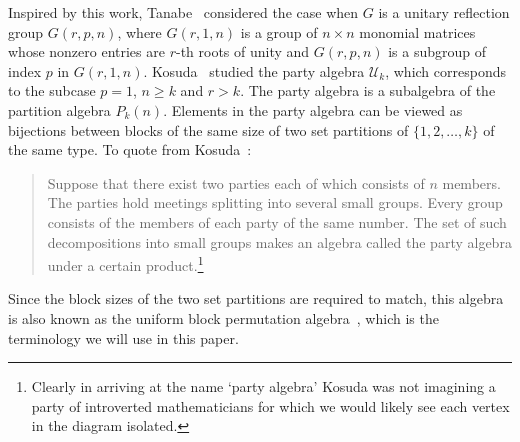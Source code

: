 \documentclass[10pt]{amsart}
\theoremstyle{definition}
\theoremstyle{remark}
\begin{document}
Inspired by this work, Tanabe~\cite{Tanabe.1997} considered the case when $G$ is a unitary reflection group $G(r,p,n)$, where $G(r,1,n)$ is a group
of $n \times n$ monomial matrices whose nonzero entries are $r$-th roots of unity and $G(r,p,n)$ is a subgroup of index $p$ in $G(r,1,n)$.
Kosuda~\cite{Kosuda.2000, Kosuda.2006} studied the party algebra $\mathcal{U}_k$, which corresponds to the subcase $p=1$, $n \geqslant k$
and $r>k$. The party algebra is a subalgebra of the partition algebra $P_k(n)$. Elements in the party algebra can be viewed as bijections between blocks
of the same size of two set partitions of $\{1,2,\ldots,k\}$ of the same type. To quote from Kosuda~\cite{Kosuda.2000}:
\begin{quote}
Suppose that there exist two parties each of which consists of $n$ members. The parties hold meetings splitting into several small groups.
Every group consists of the members of each party of the same number. The set of such decompositions into small groups makes an algebra
called the party algebra under a certain product.\footnote{Clearly in arriving at the name
`party algebra' Kosuda was not imagining a party of introverted mathematicians for
which we would likely see each vertex in the diagram isolated.}
\end{quote}
Since the block sizes of the two set  partitions are required to match, this algebra is also known as the uniform block permutation
algebra~\cite{FitzGerald.2003}, which is the terminology we will use in this paper.
\end{document}
